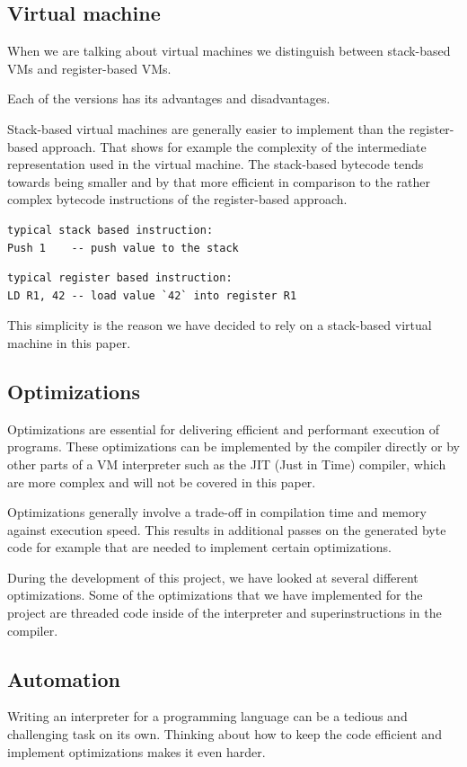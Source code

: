 \documentclass{article}
\begin{document}
\subsection{Virtual machine}
When we are talking about virtual machines we distinguish between stack-based VMs and 
register-based VMs.

Each of the versions has its advantages and disadvantages.

Stack-based virtual machines are generally easier to implement than the register-based approach.
That shows for example the complexity of the intermediate representation used in the virtual 
machine. The stack-based bytecode tends towards being smaller and by that more efficient in 
comparison to the rather complex bytecode instructions of the register-based approach.

\begin{verbatim}
typical stack based instruction:
Push 1    -- push value to the stack
\end{verbatim}

\begin{verbatim}
typical register based instruction:
LD R1, 42 -- load value `42` into register R1
\end{verbatim}

This simplicity is the reason we have decided to rely on a stack-based virtual machine in
this paper.

\subsection{Optimizations}
Optimizations are essential for delivering efficient and performant execution of
programs. These optimizations can be implemented by the compiler directly or
by other parts of a VM interpreter such as the JIT (Just in Time) compiler, which
are more complex and will not be covered in this paper.

Optimizations generally involve a trade-off in compilation time and memory
against execution speed. This results in additional passes on the generated
byte code for example that are needed to implement certain optimizations.

During the development of this project, we have looked at several different
optimizations. Some of the optimizations that we have implemented for the
project are threaded code inside of the interpreter and superinstructions in
the compiler.

\subsection{Automation}
Writing an interpreter for a programming language can be a tedious and
challenging task on its own. Thinking about how to keep the code efficient and
implement optimizations makes it even harder.
\end{document}
